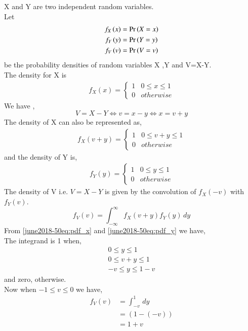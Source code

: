 
X and Y are two independent random variables. \\
Let
\begin{align}
    f_X\left(x\right) &= \Pr\left(X=x\right) \\
    f_Y\left(y\right) &= \Pr\left(Y=y\right)  \\
    f_V\left(v\right) &= \Pr\left(V=v\right)
\end{align}
be the probability densities of random variables X ,Y and V=X-Y.\\
The density for X is \\
\begin{align}
\label{june2018-50eq:_pdf_x}
f_{X}(x)  = 
\begin{cases}
1 & 0 \le x \le 1
\\
0 & otherwise
\end{cases}
\end{align}
We have ,
\begin{equation}
    V= X-Y \iff v= x- y \iff x = v+y
\end{equation}
The density of X can also be represented as,
\begin{align}
\label{june2018-50eq:pdf_x}
f_{X}(v+y)  = 
\begin{cases}
1 & 0 \le v+y \le 1
\\
0 & otherwise
\end{cases}
\end{align}
and the density of Y is,
\begin{align}
\label{june2018-50eq:pdf_y}
f_{Y}(y)  = 
\begin{cases}
1 & 0 \le y \le 1
\\
0 & otherwise
\end{cases}
\end{align}
The density of V i.e. $V=X-Y $ is given by the convolution of $f_X(-v)$ with $f_Y(v)$.
\begin{equation}
    f_V(v) =  \int_{- \infty}^{\infty} f_X(v+y)f_Y(y) \,dy 
\end{equation}
From \ref{june2018-50eq:pdf_x} and \ref{june2018-50eq:pdf_y} we have, \\
The integrand is 1 when,
\begin{align}
    0 \le y \le 1 \\
    0 \le v+y \le 1 \\
    -v \le y \le 1-v
\end{align}
and zero, otherwise. \\
Now when $-1 \le v \le 0$ we have, 
\begin{align}
    f_V(v) &=   \int_{-v}^{1} \,dy  \\
          &= (1 - (-v)) \\
          &= 1+v
\end{align}

